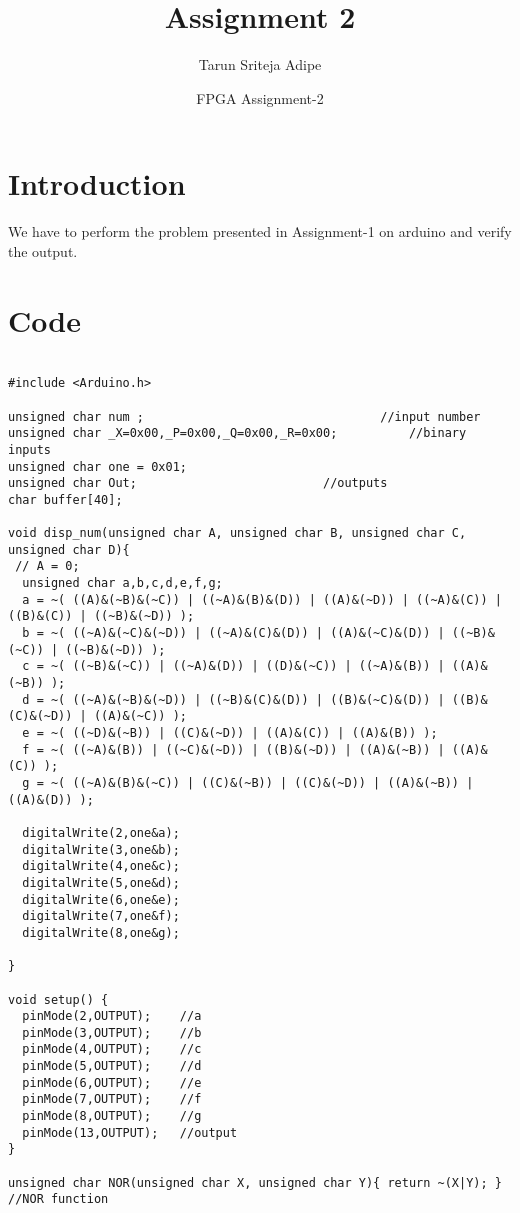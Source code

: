 \documentclass{article}
\title{Assignment 2}
\author{Tarun Sriteja Adipe}
\date{FPGA Assignment-2}
\begin{document}
\maketitle

\section{Introduction}

We have to perform the problem presented in Assignment-1 on arduino and verify the output.

\section{Code}

\begin{verbatim}

#include <Arduino.h>

unsigned char num ;                             	//input number
unsigned char _X=0x00,_P=0x00,_Q=0x00,_R=0x00;      	//binary inputs
unsigned char one = 0x01;
unsigned char Out;                         	//outputs
char buffer[40];

void disp_num(unsigned char A, unsigned char B, unsigned char C, unsigned char D){
 // A = 0;
  unsigned char a,b,c,d,e,f,g;
  a = ~( ((A)&(~B)&(~C)) | ((~A)&(B)&(D)) | ((A)&(~D)) | ((~A)&(C)) | ((B)&(C)) | ((~B)&(~D)) );
  b = ~( ((~A)&(~C)&(~D)) | ((~A)&(C)&(D)) | ((A)&(~C)&(D)) | ((~B)&(~C)) | ((~B)&(~D)) );
  c = ~( ((~B)&(~C)) | ((~A)&(D)) | ((D)&(~C)) | ((~A)&(B)) | ((A)&(~B)) );
  d = ~( ((~A)&(~B)&(~D)) | ((~B)&(C)&(D)) | ((B)&(~C)&(D)) | ((B)&(C)&(~D)) | ((A)&(~C)) );
  e = ~( ((~D)&(~B)) | ((C)&(~D)) | ((A)&(C)) | ((A)&(B)) );
  f = ~( ((~A)&(B)) | ((~C)&(~D)) | ((B)&(~D)) | ((A)&(~B)) | ((A)&(C)) );
  g = ~( ((~A)&(B)&(~C)) | ((C)&(~B)) | ((C)&(~D)) | ((A)&(~B)) | ((A)&(D)) );

  digitalWrite(2,one&a);
  digitalWrite(3,one&b);
  digitalWrite(4,one&c);
  digitalWrite(5,one&d);
  digitalWrite(6,one&e);
  digitalWrite(7,one&f);
  digitalWrite(8,one&g);

}

void setup() {
  pinMode(2,OUTPUT);    //a
  pinMode(3,OUTPUT);    //b
  pinMode(4,OUTPUT);    //c
  pinMode(5,OUTPUT);    //d
  pinMode(6,OUTPUT);    //e
  pinMode(7,OUTPUT);    //f
  pinMode(8,OUTPUT);    //g
  pinMode(13,OUTPUT);   //output
}

unsigned char NOR(unsigned char X, unsigned char Y){ return ~(X|Y); } //NOR function


\end{verbatim}
\end{document}
